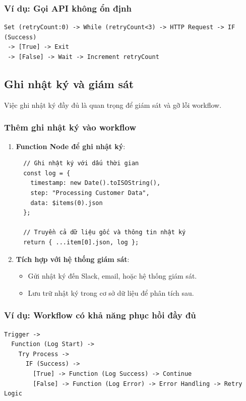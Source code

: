 \subsubsection{Ví dụ: Gọi API không ổn định}

\begin{verbatim}
Set (retryCount:0) -> While (retryCount<3) -> HTTP Request -> IF (Success)
 -> [True] -> Exit 
 -> [False] -> Wait -> Increment retryCount
\end{verbatim}
\subsection{Ghi nhật ký và giám sát}

Việc ghi nhật ký đầy đủ là quan trọng để giám sát và gỡ lỗi workflow.

\subsubsection{Thêm ghi nhật ký vào workflow}

\begin{enumerate}
  \item \textbf{Function Node để ghi nhật ký}:
  \begin{verbatim}
  // Ghi nhật ký với dấu thời gian
  const log = {
    timestamp: new Date().toISOString(),
    step: "Processing Customer Data",
    data: $items(0).json
  };
  
  // Truyền cả dữ liệu gốc và thông tin nhật ký
  return { ...item[0].json, log };
  \end{verbatim}

  \item \textbf{Tích hợp với hệ thống giám sát}:
  \begin{itemize}
    \item Gửi nhật ký đến Slack, email, hoặc hệ thống giám sát.
    \item Lưu trữ nhật ký trong cơ sở dữ liệu để phân tích sau.
  \end{itemize}
\end{enumerate}

\subsubsection{Ví dụ: Workflow có khả năng phục hồi đầy đủ}

\begin{verbatim}
Trigger -> 
  Function (Log Start) -> 
    Try Process -> 
      IF (Success) -> 
        [True] -> Function (Log Success) -> Continue
        [False] -> Function (Log Error) -> Error Handling -> Retry Logic
\end{verbatim}

